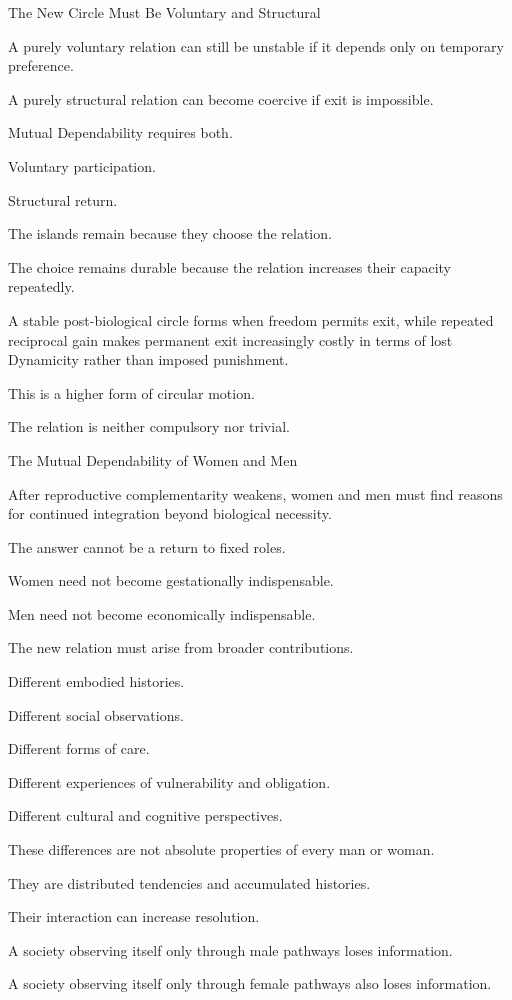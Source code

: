 The New Circle Must Be Voluntary and Structural

A purely voluntary relation can still be unstable if it depends only on temporary preference.

A purely structural relation can become coercive if exit is impossible.

Mutual Dependability requires both.

Voluntary participation.

Structural return.

The islands remain because they choose the relation.

The choice remains durable because the relation increases their capacity repeatedly.

A stable post-biological circle forms when freedom permits exit, while repeated reciprocal gain makes permanent exit increasingly costly in terms of lost Dynamicity rather than imposed punishment.

This is a higher form of circular motion.

The relation is neither compulsory nor trivial.

The Mutual Dependability of Women and Men

After reproductive complementarity weakens, women and men must find reasons for continued integration beyond biological necessity.

The answer cannot be a return to fixed roles.

Women need not become gestationally indispensable.

Men need not become economically indispensable.

The new relation must arise from broader contributions.

Different embodied histories.

Different social observations.

Different forms of care.

Different experiences of vulnerability and obligation.

Different cultural and cognitive perspectives.

These differences are not absolute properties of every man or woman.

They are distributed tendencies and accumulated histories.

Their interaction can increase resolution.

A society observing itself only through male pathways loses information.

A society observing itself only through female pathways also loses information.

